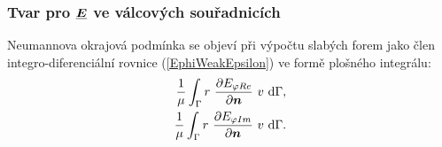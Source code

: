 \documentclass[12pt,a4paper,oneside]{article}
\numberwithin{equation}{section} %
\numberwithin{figure}{section} %
\numberwithin{table}{section} %
\renewcommand{\vec}[1]{\mbox{\boldmath$#1$}} %
\newcommand{\faz}[1]{{\underline{#1}}} %
\begin{document}
\subsubsection*{Tvar pro $\faz{\vec{E}}$ ve válcových souřadnicích}
\label{NeumannEC}
Neumannova okrajová podmínka se objeví při výpočtu slabých forem jako člen integro-diferenciální rovnice (\ref{EphiWeakEpsilon}) ve formě plošného integrálu:
\begin{subequations}
\label{ECweakneumann}
\begin{align}
\frac{1}{\mu} \int _{\Gamma} r ~ \frac{\partial E _{\varphi Re}}{\partial \vec{n}} ~ v ~ \ud \Gamma ,
\\ 
\frac{1}{\mu} \int _{\Gamma} r ~ \frac{\partial E _{\varphi Im}}{\partial \vec{n}} ~ v ~ \ud \Gamma .
\end{align}
\end{subequations}
\end{document}
